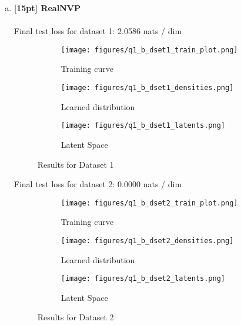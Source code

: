 \documentclass{article}
\begin{document}
\begin{enumerate}[(a)]
\item {\bf [15pt] RealNVP} \\\\
Final test loss for dataset 1: 2.0586  nats / dim
\begin{figure}[H]
    \centering
    \begin{subfigure}{0.32\textwidth}
        \centering
        \texttt{[image: figures/q1\_b\_dset1\_train\_plot.png]}
        \caption{Training curve}
    \end{subfigure}
    \begin{subfigure}{0.32\textwidth}
        \centering
        \texttt{[image: figures/q1\_b\_dset1\_densities.png]}
        \caption{Learned distribution}
    \end{subfigure}
    \begin{subfigure}{0.32\textwidth}
        \centering
        \texttt{[image: figures/q1\_b\_dset1\_latents.png]}
        \caption{Latent Space}
    \end{subfigure}
    \caption{Results for Dataset 1}
\end{figure}
Final test loss for dataset 2: 0.0000  nats / dim
\begin{figure}[H]
    \centering
    \begin{subfigure}{0.32\textwidth}
        \centering
        \texttt{[image: figures/q1\_b\_dset2\_train\_plot.png]}
        \caption{Training curve}
    \end{subfigure}
    \begin{subfigure}{0.32\textwidth}
        \centering
        \texttt{[image: figures/q1\_b\_dset2\_densities.png]}
        \caption{Learned distribution}
    \end{subfigure}
    \begin{subfigure}{0.32\textwidth}
        \centering
        \texttt{[image: figures/q1\_b\_dset2\_latents.png]}
        \caption{Latent Space}
    \end{subfigure}
    \caption{Results for Dataset 2}
\end{figure}
\end{enumerate}



\newpage
{}
\end{document}

